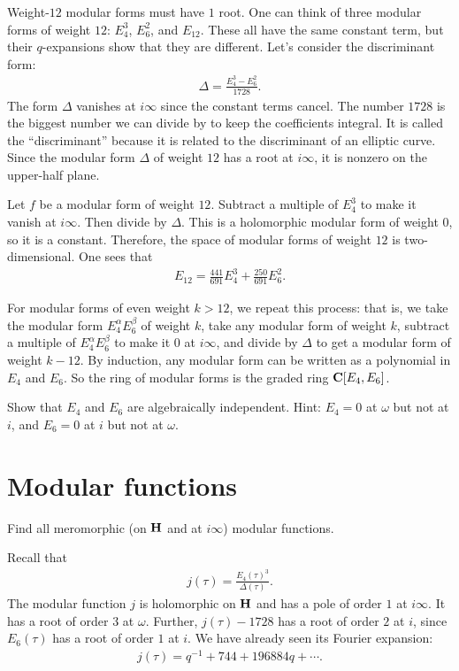 \documentclass[11pt, oneside,margin=1in]{article}
\begin{document}
Weight-$12$ modular forms must have $1$ root. One can think of three modular forms of weight $12$: $E_4^3$, $E_6^2$, and $E_{12}$. These all have the same constant term, but their $q$-expansions show that they are different. Let's consider the discriminant form:
\begin{align*}
	\Delta = \frac{E_4^3 -E_6^2 }{1728}.
\end{align*}
The form $\Delta$ vanishes at $i\infty$ since the constant terms cancel. The number $1728$ is the biggest number we can divide by to keep the coefficients integral. It is called the ``discriminant'' because it is related to the discriminant of an elliptic curve. Since the modular form $\Delta$ of weight $12$ has a root at $i\infty$, it is nonzero on the upper-half plane. 

Let $f$ be a modular form of weight $12$. Subtract a multiple of $E_4^3$ to make it vanish at $i\infty$. Then divide by $\Delta$. This is a holomorphic modular form of weight $0$, so it is a constant. Therefore, the space of modular forms of weight $12$ is two-dimensional. One sees that
\begin{align*}
	E_{12} = \frac{441}{691}E_4^3 + \frac{250}{691}E_6^2.
\end{align*}

For modular forms of even weight $k>12$, we repeat this process: that is, we take the modular form $E_4^\alpha E_6^\beta$ of weight $k$, take any modular form of weight $k$, subtract a multiple of $E_4^\alpha E_6^\beta$ to make it $0$ at $i\infty$, and divide by $\Delta$ to get a modular form of weight $k-12$. By induction, any modular form can be written as a polynomial in $E_4$ and $E_6$. So the ring of modular forms is the graded ring $\mathbf C[E_4,E_6]$.

\begin{exercise}\label{}\text{}
Show that $E_4$ and $E_6$ are algebraically independent. Hint: $E_4=0$ at $\omega$ but not at $i$, and $E_6=0$ at $i$ but not at $\omega$.
\end{exercise}

\section{Modular functions}
\begin{problem}
	Find all meromorphic (on $\mathbf H$ and at $i\infty$) modular functions. 
\end{problem}

Recall that
\begin{align*}
	j(\tau) =  \frac{E_4(\tau)^3}{\Delta(\tau)}.
\end{align*}
The modular function $j$ is holomorphic on $\mathbf H$ and has a pole of order $1$ at $i\infty$. It has a root of order $3$ at $\omega$. Further, $j(\tau)-1728$ has a root of order $2$ at $i$, since $E_6(\tau)$ has a root of order $1$ at $i$. We have already seen its Fourier expansion:
\begin{align*}
	j(\tau) = q ^{-1} + 744 + 196884q + \cdots.
\end{align*}
\end{document}
